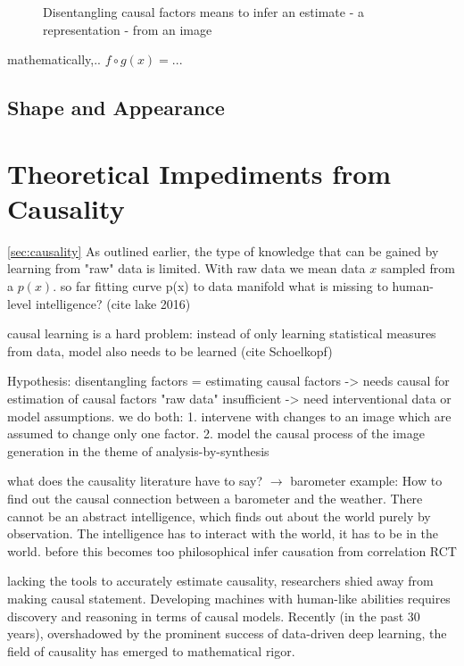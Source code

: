 		\begin{figure}[ht]
			\centering
			
			\caption{Disentangling causal factors means to infer an estimate - \ie a representation - from an image}
			\label{fig:infer}
		\end{figure}
		mathematically,..
		$f \circ g (x) = ... $

	\subsection{Shape and Appearance}

\section{Theoretical Impediments from Causality}\ref{sec:causality}
	As outlined earlier, the type of knowledge that can be gained by learning from "raw" data is limited. With raw data we mean data $x$ sampled from a $p(x)$.
	so far fitting curve p(x) to data manifold
	what is missing to human-level intelligence? (cite lake 2016)

	causal learning is a hard problem: instead of only learning statistical measures from data, model also needs to be learned (cite Schoelkopf)

	Hypothesis: disentangling factors = estimating causal factors -> needs causal
	for estimation of causal factors "raw data" insufficient -> need interventional data or model assumptions.
	we do both:
	1. intervene with changes to an image which are assumed to change only one factor.
	2. model the causal process of the image generation in the theme of analysis-by-synthesis

	what does the causality literature have to say?
	$\rightarrow$ barometer example: How to find out the causal connection between a barometer and the weather.
	There cannot be an abstract intelligence, which finds out about the world purely by observation. The intelligence has to interact with the world, it has to be in the world.
	before this becomes too philosophical
	infer causation from correlation
	RCT

	lacking the tools to accurately estimate causality, researchers shied away from making causal statement. Developing machines with human-like abilities requires discovery and reasoning in terms of causal models. Recently (in the past 30 years), overshadowed by the prominent success of data-driven deep learning, the field of causality has emerged to mathematical rigor.


